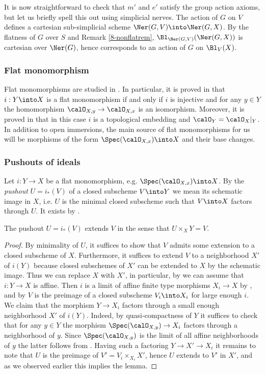 \documentclass[10pt]{../fichiers-configuration-latex/smfart}
\begin{document}
It is now straightforward to check that $m'$ and $e'$ satisfy
the group action axioms, but let us briefly spell this out
using simplicial nerves. The action of $G$ on $V$ defines a
cartesian sub-simplicial scheme $\Ner(G,V)\into\Ner(G,X)$. By
the flatness of $G$ over $S$ and Remark \ref{8-nonflatrem},
$\Bl_{\Ner(G,V)}(\Ner(G,X))$ is cartesian over $\Ner(G)$, hence
corresponds to an action of $G$ on $\Bl_V(X)$.

\subsubsection{Flat monomorphism}\label{8-flatmonsec} Flat
monomorphisms are studied in \cite{Ray@Raynaud}. In particular, it is
proved in \cite[Prop. 1.1]{Ray@Raynaud} that $i:Y\into X$ is a flat
monomorphism if and only if $i$ is injective and for any $y\in Y$ the
homomorphism $\calO_{X,y}\to\calO_{X,x}$ is an isomorphism. Moreover,
it is proved in \cite[Prop. 1.2]{Ray@Raynaud} that in this case $i$
is a topological embedding and $\calO_Y=\calO_X|_{Y}$. In addition
to open immersions, the main source of flat monomorphisms for us
will be morphisms of the form $\Spec(\calO_{X,x})\into X$ and their
base changes.

\subsubsection{Pushouts of ideals}\label{8-pushidealsec}
Let $i{\colon}Y\to X$ be a flat monomorphism,
e.g. $\Spec(\calO_{X,x})\into X$. By the {\em pushout} $U=i_*(V)$
of a closed subscheme $V\into Y$ we mean its schematic image in
$X$, i.e. $U$ is the minimal closed subscheme such that $V\into X$
factors through $U$. It exists by .

\begin{lemma2}\label{8-pushideallem} The pushout $U=i_*(V)$ extends
$V$ in the sense that $U\times_XY=V$.  \end{lemma2} \begin{proof} By
minimality of $U$, it suffices to show that $V$ admits some extension
to a closed subscheme of $X$. Furthermore, it suffices to extend $V$
to a neighborhood $X'$ of $i(Y)$ because closed subschemes of $X'$
can be extended to $X$ by the schematic image. Thus we can replace
$X$ with $X'$, in particular, by \cite[1.5(i)]{Ray@Raynaud} we
can assume that $i{\colon}Y\to X$ is affine. Then $i$ is a limit
of affine finite type morphisms $X_i\to X$ by ,
and by  $V$ is the preimage of a
closed subscheme $V_i\into X_i$ for large enough $i$. We claim that
the morphism $Y\to X_i$ factors through a small enough neighborhood
$X'$ of $i(Y)$. Indeed, by quasi-compactness of $Y$ it suffices to
check that for any $y\in Y$ the morphism $\Spec(\calO_{X,y})\to X_i$
factors through a neighborhood of $y$. Since $\Spec(\calO_{X,y})$ is
the limit of all affine neighborhoods of $y$ the latter follows from
. Having such a factoring $Y\to X'\to X_i$ it
remains to note that $U$ is the preimage of $V'=V_i\times_{X_i}X'$,
hence $U$ extends to $V'$ in $X'$, and as we observed earlier this
implies the lemma.  \end{proof}
\end{document}
